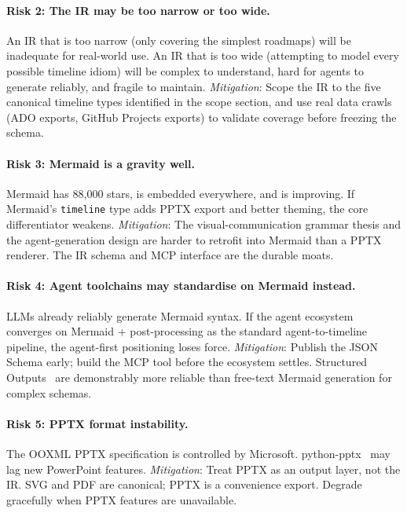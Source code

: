 \paragraph{Risk 2: The IR may be too narrow or too wide.}
An IR that is too narrow (only covering the simplest roadmaps) will be
inadequate for real-world use.
An IR that is too wide (attempting to model every possible timeline idiom)
will be complex to understand, hard for agents to generate reliably, and
fragile to maintain.
\textit{Mitigation}: Scope the IR to the five canonical timeline types
identified in the scope section, and use real data crawls (ADO exports,
GitHub Projects exports) to validate coverage before freezing the schema.

\paragraph{Risk 3: Mermaid is a gravity well.}
Mermaid has 88{,}000 stars, is embedded everywhere, and is improving.
If Mermaid's \texttt{timeline} type adds PPTX export and better theming,
the core differentiator weakens.
\textit{Mitigation}: The visual-communication grammar thesis and the
agent-generation design are harder to retrofit into Mermaid than a PPTX
renderer. The IR schema and MCP interface are the durable moats.

\paragraph{Risk 4: Agent toolchains may standardise on Mermaid instead.}
LLMs already reliably generate Mermaid syntax.
If the agent ecosystem converges on Mermaid + post-processing as the
standard agent-to-timeline pipeline, the agent-first positioning loses force.
\textit{Mitigation}: Publish the JSON Schema early; build the MCP tool
before the ecosystem settles.  Structured Outputs~\cite{openai-structured-outputs}
are demonstrably more reliable than free-text Mermaid generation for
complex schemas.

\paragraph{Risk 5: PPTX format instability.}
The OOXML PPTX specification is controlled by Microsoft.
python-pptx~\cite{python-pptx} may lag new PowerPoint features.
\textit{Mitigation}: Treat PPTX as an output layer, not the IR.
SVG and PDF are canonical; PPTX is a convenience export.
Degrade gracefully when PPTX features are unavailable.
